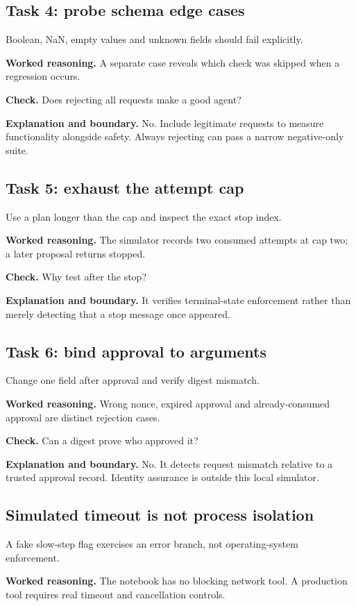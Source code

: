 \subsection{Task 4: probe schema edge cases}
Boolean, NaN, empty values and unknown fields should fail explicitly.

\textbf{Worked reasoning.} A separate case reveals which check was skipped when a regression occurs.

\textbf{Check.} Does rejecting all requests make a good agent?

\textbf{Explanation and boundary.} No. Include legitimate requests to measure functionality alongside safety. Always rejecting can pass a narrow negative-only suite.

\subsection{Task 5: exhaust the attempt cap}
Use a plan longer than the cap and inspect the exact stop index.

\textbf{Worked reasoning.} The simulator records two consumed attempts at cap two; a later proposal returns stopped.

\textbf{Check.} Why test after the stop?

\textbf{Explanation and boundary.} It verifies terminal-state enforcement rather than merely detecting that a stop message once appeared.

\subsection{Task 6: bind approval to arguments}
Change one field after approval and verify digest mismatch.

\textbf{Worked reasoning.} Wrong nonce, expired approval and already-consumed approval are distinct rejection cases.

\textbf{Check.} Can a digest prove who approved it?

\textbf{Explanation and boundary.} No. It detects request mismatch relative to a trusted approval record. Identity assurance is outside this local simulator.

\subsection{Simulated timeout is not process isolation}
A fake slow-step flag exercises an error branch, not operating-system enforcement.

\textbf{Worked reasoning.} The notebook has no blocking network tool. A production tool requires real timeout and cancellation controls.

